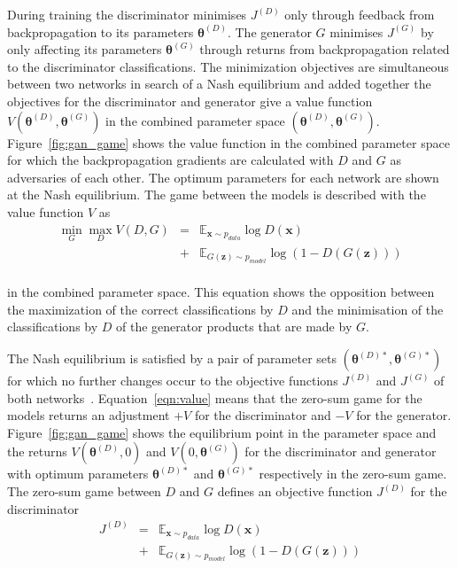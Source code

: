 \documentclass[twocolumn]{article}
\numberwithin{equation}{section}
\begin{document}
During training the discriminator minimises $J^{(D)}$ only through feedback from backpropagation to its parameters $\bm{\theta}^{(D)}$. The generator $G$ minimises $J^{(G)}$ by only affecting its parameters $\bm{\theta}^{(G)}$ through returns from backpropagation related to the discriminator classifications. The minimization objectives are simultaneous between two networks in search of a Nash equilibrium and added together the objectives for the discriminator and generator give a value function $V(\bm{\theta}^{(D)}, \bm{\theta}^{(G)})$ in the combined parameter space $(\bm{\theta}^{(D)}, \bm{\theta}^{(G)})$. Figure~\ref{fig:gan_game} shows the value function in the combined parameter space for which the backpropagation gradients are calculated with $D$ and $G$ as adversaries of each other. The optimum parameters for each network are shown at the Nash equilibrium. The game between the models is described with the value function $V$ as 
\begin{eqnarray}\label{eqn:value}
    \min_G \max_D V(D,G) &=& \mathbb{E}_{\mathbf{x}\sim p_{data}}\log D(\mathbf{x})                                                           \nonumber \\
                         &+& \mathbb{E}_{G(\mathbf{z}) \sim p_{model}}\log(1-D(G(\mathbf{z}))) \nonumber \\
\end{eqnarray}

in the combined parameter space. This equation shows the opposition between the maximization of the correct classifications by $D$ and the minimisation of the classifications by $D$ of the generator products that are made by $G$. 

The Nash equilibrium is satisfied by a pair of parameter sets $(\bm{\theta}^{(D)*}, \bm{\theta}^{(G)*})$ for which no further changes occur to the objective functions $J^{(D)}$ and $J^{(G)}$ of both networks~\cite{NIPS16}. Equation~\ref{eqn:value} means that the zero-sum game for the models returns an adjustment $+V$ for the discriminator and $-V$ for the generator. Figure~\ref{fig:gan_game} shows the equilibrium point in the parameter space and the returns $V(\bm{\theta}^{(D)}, 0)$ and $V(0, \bm{\theta}^{(G)})$ for the discriminator and generator with optimum parameters $\bm{\theta}^{(D)*}$ and $\bm{\theta}^{(G)*}$ respectively in the zero-sum game. The zero-sum game between $D$ and $G$ defines an objective function $J^{(D)}$ for the discriminator
\begin{eqnarray}\label{eq:J_D}
    J^{(D)} &=& \mathbb{E}_{\mathbf{x} \sim p_{data}}\log D(\mathbf{x})  \nonumber \\
            &+&\mathbb{E}_{G(\mathbf{z}) \sim p_{model}}\log (1 - D(G(\mathbf{z})))
\end{eqnarray}
\end{document}

